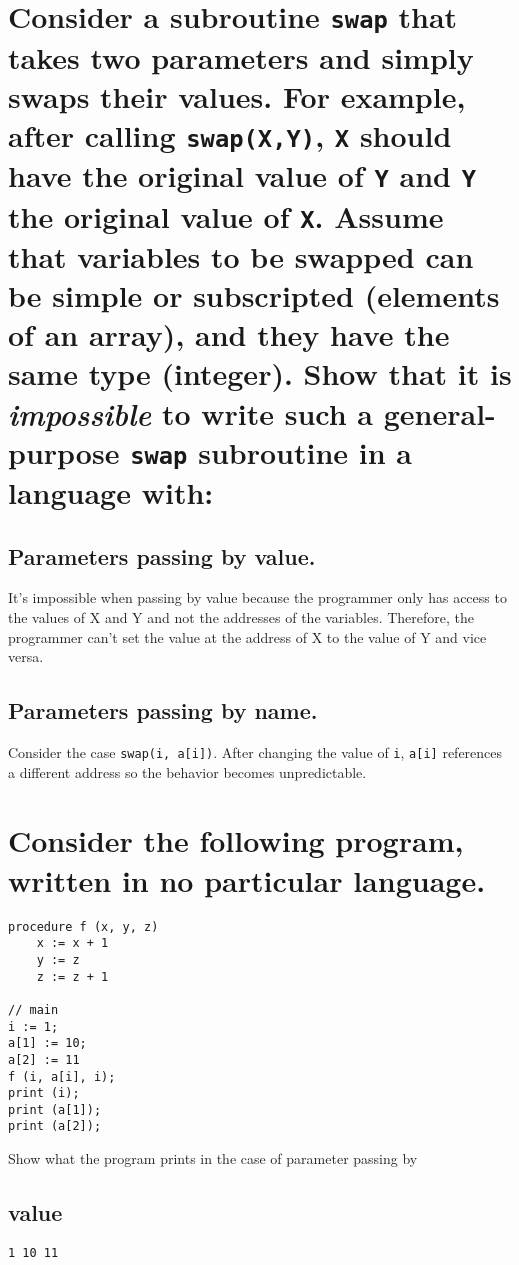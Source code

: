 \documentclass[letterpaper]{article}
\begin{document}
\section{Consider a subroutine \texttt{swap} that takes two parameters and simply swaps their values. For example, after calling \texttt{swap(X,Y)}, \texttt{X} should have the original value of \texttt{Y} and \texttt{Y} the original value of \texttt{X}. Assume that variables to be swapped can be simple or subscripted (elements of an array), and they have the same type (integer). Show that it is \textit{impossible} to write such a general-purpose \texttt{swap} subroutine in a language with:}
\subsection{Parameters passing by value.}
\begin{adjustwidth}{2.35em}{0pt}
It's impossible when passing by value because the programmer only has access to the values of X and Y and not the addresses of the variables. Therefore, the programmer can't set the value at the address of X to the value of Y and vice versa.
\end{adjustwidth}
\subsection{Parameters passing by name.}
\begin{adjustwidth}{2.35em}{0pt}
Consider the case \texttt{swap(i, a[i])}. After changing the value of \texttt{i}, \texttt{a[i]} references a different address so the behavior becomes unpredictable.
\end{adjustwidth}

\section{Consider the following program, written in no particular language.}
\begin{adjustwidth}{2.35em}{0pt}
\begin{Verbatim}
procedure f (x, y, z)
	x := x + 1
	y := z
	z := z + 1

// main
i := 1;
a[1] := 10;
a[2] := 11
f (i, a[i], i);
print (i);
print (a[1]);
print (a[2]);
\end{Verbatim}
Show what the program prints in the case of parameter passing by
\end{adjustwidth}
\subsection{value}
\begin{adjustwidth}{2.35em}{0pt}
\begin{Verbatim}
1 10 11
\end{Verbatim}
\end{adjustwidth}
\end{document}
